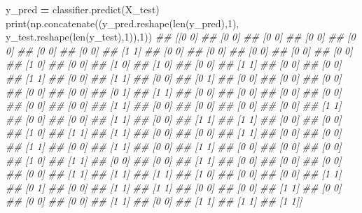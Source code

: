 \documentclass[
]{book}
\newenvironment{Shaded}{\begin{snugshade}}{\end{snugshade}}
\newcommand{\BuiltInTok}[1]{#1}
\newcommand{\CommentTok}[1]{\textcolor[rgb]{0.56,0.35,0.01}{\textit{#1}}}
\newcommand{\DecValTok}[1]{\textcolor[rgb]{0.00,0.00,0.81}{#1}}
\newcommand{\NormalTok}[1]{#1}
\newcommand{\OperatorTok}[1]{\textcolor[rgb]{0.81,0.36,0.00}{\textbf{#1}}}
\theoremstyle{definition}
\theoremstyle{definition}
\theoremstyle{definition}
\theoremstyle{definition}
\theoremstyle{remark}
\begin{document}
\begin{Shaded}
\begin{Highlighting}[]
\NormalTok{y\_pred }\OperatorTok{=}\NormalTok{ classifier.predict(X\_test)}
\BuiltInTok{print}\NormalTok{(np.concatenate((y\_pred.reshape(}\BuiltInTok{len}\NormalTok{(y\_pred),}\DecValTok{1}\NormalTok{), y\_test.reshape(}\BuiltInTok{len}\NormalTok{(y\_test),}\DecValTok{1}\NormalTok{)),}\DecValTok{1}\NormalTok{))}
\CommentTok{\#\# [[0 0]}
\CommentTok{\#\#  [0 0]}
\CommentTok{\#\#  [0 0]}
\CommentTok{\#\#  [0 0]}
\CommentTok{\#\#  [0 0]}
\CommentTok{\#\#  [0 0]}
\CommentTok{\#\#  [0 0]}
\CommentTok{\#\#  [1 1]}
\CommentTok{\#\#  [0 0]}
\CommentTok{\#\#  [0 0]}
\CommentTok{\#\#  [0 0]}
\CommentTok{\#\#  [0 0]}
\CommentTok{\#\#  [0 0]}
\CommentTok{\#\#  [1 0]}
\CommentTok{\#\#  [0 0]}
\CommentTok{\#\#  [1 0]}
\CommentTok{\#\#  [1 0]}
\CommentTok{\#\#  [0 0]}
\CommentTok{\#\#  [1 1]}
\CommentTok{\#\#  [0 0]}
\CommentTok{\#\#  [0 0]}
\CommentTok{\#\#  [1 1]}
\CommentTok{\#\#  [0 0]}
\CommentTok{\#\#  [1 1]}
\CommentTok{\#\#  [0 0]}
\CommentTok{\#\#  [0 1]}
\CommentTok{\#\#  [0 0]}
\CommentTok{\#\#  [0 0]}
\CommentTok{\#\#  [0 0]}
\CommentTok{\#\#  [0 0]}
\CommentTok{\#\#  [0 0]}
\CommentTok{\#\#  [0 1]}
\CommentTok{\#\#  [1 1]}
\CommentTok{\#\#  [0 0]}
\CommentTok{\#\#  [0 0]}
\CommentTok{\#\#  [0 0]}
\CommentTok{\#\#  [0 0]}
\CommentTok{\#\#  [0 0]}
\CommentTok{\#\#  [0 0]}
\CommentTok{\#\#  [1 1]}
\CommentTok{\#\#  [0 0]}
\CommentTok{\#\#  [0 0]}
\CommentTok{\#\#  [0 0]}
\CommentTok{\#\#  [0 0]}
\CommentTok{\#\#  [1 1]}
\CommentTok{\#\#  [0 0]}
\CommentTok{\#\#  [0 0]}
\CommentTok{\#\#  [1 1]}
\CommentTok{\#\#  [0 0]}
\CommentTok{\#\#  [1 1]}
\CommentTok{\#\#  [1 1]}
\CommentTok{\#\#  [0 0]}
\CommentTok{\#\#  [0 0]}
\CommentTok{\#\#  [1 0]}
\CommentTok{\#\#  [1 1]}
\CommentTok{\#\#  [1 1]}
\CommentTok{\#\#  [0 0]}
\CommentTok{\#\#  [0 0]}
\CommentTok{\#\#  [1 1]}
\CommentTok{\#\#  [0 0]}
\CommentTok{\#\#  [0 0]}
\CommentTok{\#\#  [1 1]}
\CommentTok{\#\#  [0 0]}
\CommentTok{\#\#  [1 1]}
\CommentTok{\#\#  [0 0]}
\CommentTok{\#\#  [1 1]}
\CommentTok{\#\#  [0 0]}
\CommentTok{\#\#  [0 0]}
\CommentTok{\#\#  [0 0]}
\CommentTok{\#\#  [1 0]}
\CommentTok{\#\#  [1 1]}
\CommentTok{\#\#  [0 0]}
\CommentTok{\#\#  [0 0]}
\CommentTok{\#\#  [1 1]}
\CommentTok{\#\#  [0 0]}
\CommentTok{\#\#  [0 0]}
\CommentTok{\#\#  [0 0]}
\CommentTok{\#\#  [0 0]}
\CommentTok{\#\#  [1 1]}
\CommentTok{\#\#  [1 1]}
\CommentTok{\#\#  [1 1]}
\CommentTok{\#\#  [1 0]}
\CommentTok{\#\#  [0 0]}
\CommentTok{\#\#  [0 0]}
\CommentTok{\#\#  [1 1]}
\CommentTok{\#\#  [0 1]}
\CommentTok{\#\#  [0 0]}
\CommentTok{\#\#  [1 1]}
\CommentTok{\#\#  [1 1]}
\CommentTok{\#\#  [0 0]}
\CommentTok{\#\#  [0 0]}
\CommentTok{\#\#  [1 1]}
\CommentTok{\#\#  [0 0]}
\CommentTok{\#\#  [0 0]}
\CommentTok{\#\#  [0 0]}
\CommentTok{\#\#  [1 1]}
\CommentTok{\#\#  [0 0]}
\CommentTok{\#\#  [1 1]}
\CommentTok{\#\#  [1 1]}
\CommentTok{\#\#  [1 1]]}
\end{Highlighting}
\end{Shaded}
\end{document}
